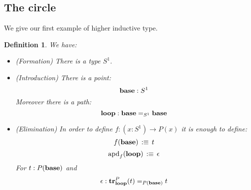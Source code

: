 \documentclass{article}
\newcommand{\sse}[1]{\medbreak \subsection{#1}}
\newcommand{\U}{{\mathcal U}}
\renewcommand{\r}{\rightarrow}
\newcommand{\apd}{\mathrm{apd}}
\newcommand{\tr}{\mathrm{\bf tr}}
\newcommand{\fib}{\mathrm{\bf fib}}
\newcommand{\base}{\mathrm{\bf base}}
\renewcommand{\loop}{\mathrm{\bf loop}}
\newcommand{\one}{{\bf 1}}
\newcommand{\Eq}{\mathrm{Eq}}
\newtheorem{lemma}{Lemma}
\newtheorem{definition}{Definition}
\newcommand{\comment}[1]{}
\begin{document}
\comment{



\begin{lemma}
Assume given $A:\U$ with $a:A$. Assume given $\Eq_A : A\r \U$ with $q : \Eq_A(a)$. Then if:
\[(x:A)\times \Eq_A(x)\]
is contractible, we have for all $x:A$:
\[\Eq_A(x) \simeq a=_A x\]
\end{lemma}
\begin{proof}
We consider the map: 
\[p_A:(x:A)\times \Eq_A(x)\r A\]
We denote by $*_a : \one \r A$ the map defined by $*_A(x) :\equiv a$. We want to show that:
$*_a=_{\U_{/A}} p_A$
\begin{itemize}
\item By the characterization of identity types in it is enough to find an equivalence:
\[\phi : \one \r (x:A)\times \Eq_A(x)\] 
such that $p_A\circ \phi \sim *_a$.
\item We define $\phi$ by induction:
\[\phi(*) \, :\equiv \, (a,q)\]
\item It is immediate to check by induction that $p_A\circ \phi \sim *_a$.
\item The map $\phi$ is an equivalence because any map between contractible type is an equivalence.
\end{itemize}
So we know that for all $b:A$ we have
\[\fib_{*_a}(b)\, \simeq\, \fib_{p_A}(b)\]
From the Grothendieck we know that:
\[\fib_{p_A}(b) \, \simeq \, \Eq_A(b)\]
Now we see:
\[\fib_{*_a}(b) \ \equiv\  (x:\one)\times (*_a(x)=_Ab) \]
\[\ \equiv\  \one\times (a=_Ab) \]
\[\ \simeq\ a=_Ab\]
So we can conclude.
\end{proof}
}


\sse{The circle}

We give our first example of higher inductive type.

\begin{definition}
We have:
\begin{itemize}
\item (Formation) There is a type $S^1$.
\item (Introduction) There is a point: \[\base : S^1\] 
Moreover there is a path: \[\loop : \base=_{S^1}\base\]
\item (Elimination) In order to define $f:(x:S^1) \r P(x)$ it is enough to define:
\[f(\base) \, :\equiv\, t \]
\[\apd_f(\loop) \, :\equiv\, \epsilon\]
For $t:P(\base)$ and 
\[\epsilon : \tr^P_\loop(t) =_{P(\base)} t\]%
\end{itemize}
\end{definition}
\end{document}
